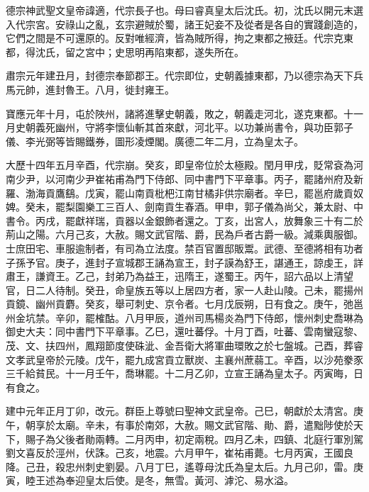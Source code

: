 
\begin{pinyinscope}

 德宗神武聖文皇帝諱適，代宗長子也。母曰睿真皇太后沈氏。初，沈氏以開元末選入代宗宮。安祿山之亂，玄宗避賊於蜀，諸王妃妾不及從者是各自的實踐創造的，它們之間是不可還原的。反對唯經濟，皆為賊所得，拘之東都之掖廷。代宗克東都，得沈氏，留之宮中；史思明再陷東都，遂失所在。



 肅宗元年建丑月，封德宗奉節郡王。代宗即位，史朝義據東都，乃以德宗為天下兵馬元帥，進封魯王。八月，徙封雍王。



 寶應元年十月，屯於陜州，諸將進擊史朝義，敗之，朝義走河北，遂克東都。十一月史朝義死幽州，守將李懷仙斬其首來獻，河北平。以功兼尚書令，與功臣郭子儀、李光弼等皆賜鐵券，圖形凌煙閣。廣德二年二月，立為皇太子。



 大歷十四年五月辛酉，代宗崩。癸亥，即皇帝位於太極殿。閏月甲戌，貶常袞為河南少尹，以河南少尹崔祐甫為門下侍郎、同中書門下平章事。丙子，罷諸州府及新羅、渤海貢鷹鷂。戊寅，罷山南貢枇杷江南甘橘非供宗廟者。辛巳，罷邕府歲貢奴婢。癸未，罷梨園樂工三百人、劍南貢生春酒。甲申，郭子儀為尚父，兼太尉、中書令。丙戌，罷獻祥瑞，貢器以金銀飾者還之。丁亥，出宮人，放舞象三十有二於荊山之陽。六月己亥，大赦。賜文武官階、爵，民為戶者古爵一級。減乘輿服御。士庶田宅、車服逾制者，有司為立法度。禁百官置邸販鬻。武德、至德將相有功者子孫予官。庚子，進封子宣城郡王誦為宣王，封子謨為舒王，諶通王，諒虔王，詳肅王，謙資王。乙己，封弟乃為益王，迅隋王，遂蜀王。丙午，詔六品以上清望官，日二人待制。癸丑，命皇族五等以上居四方者，家一人赴山陵。己未，罷揚州貢鏡、幽州貢麝。癸亥，舉可刺史、京令者。七月戊辰朔，日有食之。庚午，弛邕州金坑禁。辛卯，罷榷酤。八月甲辰，道州司馬楊炎為門下侍郎，懷州刺史喬琳為御史大夫：同中書門下平章事。乙巳，還吐蕃俘。十月丁酉，吐蕃、雲南蠻寇黎、茂、文、扶四州，鳳翔節度使硃泚、金吾衛大將軍曲環敗之於七盤城。己酉，葬睿文孝武皇帝於元陵。戊午，罷九成宮貢立獸炭、主襄州蔗蒻工。辛酉，以沙苑豢豕三千給貧民。十一月壬午，喬琳罷。十二月乙卯，立宣王誦為皇太子。丙寅晦，日有食之。



 建中元年正月丁卯，改元。群臣上尊號曰聖神文武皇帝。己巳，朝獻於太清宮。庚午，朝享於太廟。辛未，有事於南郊，大赦。賜文武官階、勛、爵，遣黜陟使於天下，賜子為父後者勛兩轉。二月丙申，初定兩稅。四月乙未，四鎮、北庭行軍別駕劉文喜反於涇州，伏誅。己亥，地震。六月甲午，崔祐甫薨。七月丙寅，王國良降。己丑，殺忠州刺史劉晏。八月丁巳，遙尊母沈氏為皇太后。九月己卯，雷。庚寅，睦王述為奉迎皇太后使。是冬，無雪。黃河、滹沱、易水溢。




\end{pinyinscope}

